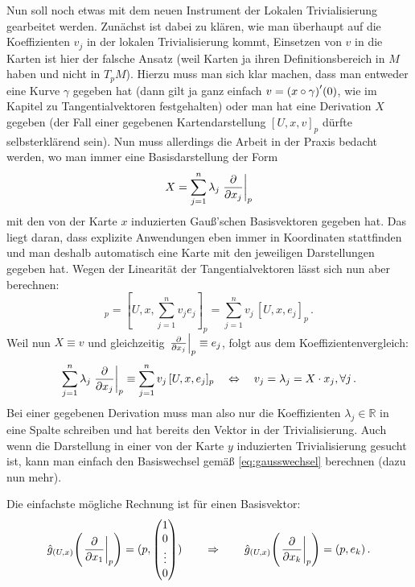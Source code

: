 \documentclass[../H_Analysis_main.tex]{subfiles}
\begin{document}
Nun soll noch etwas mit dem neuen Instrument der Lokalen Trivialisierung gearbeitet werden. Zunächst ist dabei zu klären, wie man überhaupt auf die Koeffizienten $v_j$ in der lokalen Trivialisierung kommt, Einsetzen von $v$ in die Karten ist hier der falsche Ansatz (weil Karten ja ihren Definitionsbereich in $M$ haben und nicht in $T_p M$). Hierzu muss man sich klar machen, dass man entweder eine Kurve $\gamma$ gegeben hat (dann gilt ja ganz einfach $v = \qty(x \circ \gamma)'(0)$, wie im Kapitel zu Tangentialvektoren festgehalten) oder man hat eine Derivation $X$ gegeben (der Fall einer gegebenen Kartendarstellung $[U, x, v]_p$ dürfte selbsterklärend sein). Nun muss allerdings die Arbeit in der Praxis bedacht werden, wo man immer eine Basisdarstellung der Form
\begin{equation}
X = \sum_{j = 1}^n \lambda_j \eval{\pdv{x_j}}_p
\end{equation}
mit den von der Karte $x$ induzierten Gauß'schen Basisvektoren gegeben hat. Das liegt daran, dass explizite Anwendungen eben immer in Koordinaten stattfinden und man deshalb automatisch eine Karte mit den jeweiligen Darstellungen gegeben hat. Wegen der Linearität der Tangentialvektoren lässt sich nun aber berechnen:
\begin{equation}
[U, x, v]_p = [U, x, \sum_{j = 1}^n v_j e_j]_p = \sum_{j = 1}^n v_j \, [U, x, e_j]_p \, .
\end{equation}
Weil nun $X \equiv v$ und gleichzeitig $\eval{\pdv{x_j}}_p \equiv e_j$, folgt aus dem Koeffizientenvergleich:
\begin{equation}
\sum_{j = 1}^n \lambda_j \eval{\pdv{x_j}}_p \equiv \sum_{j = 1}^n v_j \, [U, x, e_j]_p \quad \Leftrightarrow \quad v_j = \lambda_j = X \cdot x_j, \forall j \, .
\end{equation}
Bei einer gegebenen Derivation muss man also nur die Koeffizienten $\lambda_j \in \mathbb{R}$ in eine Spalte schreiben und hat bereits den Vektor in der Trivialisierung. Auch wenn die Darstellung in einer von der Karte $y$ induzierten Trivialisierung gesucht ist, kann man einfach den Basiswechsel gemäß \eqref{eq:gausswechsel} berechnen (dazu nun mehr).


\begin{bsp}[Basisvektor]
Die einfachste mögliche Rechnung ist für einen Basisvektor:
\begin{equation}
\hat{g}_{(U, x)}\qty(\eval{\pdv{x_1}}_p) = (p, \mqty(1 \\ 0 \\ \vdots \\ 0)) \qquad \Rightarrow \qquad \hat{g}_{(U, x)}\qty(\eval{\pdv{x_k}}_p) = (p, e_k) \, .
\end{equation}
\end{bsp}
\end{document}
